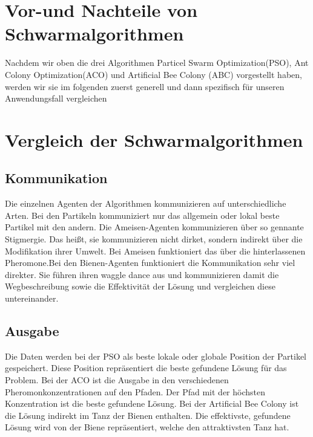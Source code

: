 \section*{Vor-und Nachteile von Schwarmalgorithmen}




Nachdem wir oben die drei Algorithmen Particel Swarm Optimization(PSO), Ant Colony Optimization(ACO) und  Artificial Bee Colony (ABC) vorgestellt haben, werden wir sie im folgenden zuerst generell und dann spezifisch für unseren Anwendungsfall vergleichen\\

\section{Vergleich der Schwarmalgorithmen}

\subsection{Kommunikation}
Die einzelnen Agenten der Algorithmen kommunizieren auf unterschiedliche Arten. Bei den Partikeln kommuniziert nur das allgemein oder lokal beste Partikel mit den andern. 
Die Ameisen-Agenten kommunizieren über so gennante Stigmergie. Das heißt, sie kommunizieren nicht dirket, sondern indirekt über die Modifikation ihrer Umwelt. Bei Ameisen funktioniert das über die hinterlassenen Pheromone.Bei den Bienen-Agenten funktioniert die Kommunikation sehr viel direkter.
Sie führen ihren waggle dance aus und kommunizieren damit die Wegbeschreibung sowie die Effektivität der Lösung und vergleichen diese untereinander.

\subsection{Ausgabe}
Die Daten werden bei der PSO als beste lokale oder globale Position der Partikel gespeichert. Diese Position repräsentiert die beste gefundene Lösung für das Problem.
Bei der ACO ist die Ausgabe in den verschiedenen Pheromonkonzentrationen auf den Pfaden. Der Pfad mit der höchsten Konzentration ist die beste gefundene Lösung.
Bei der Artificial Bee Colony ist die Lösung indirekt im Tanz der Bienen enthalten. Die effektivste, gefundene Lösung wird von der Biene repräsentiert, welche den attraktivsten Tanz hat.

